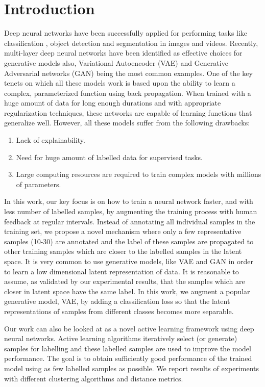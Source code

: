 \documentclass[runningheads]{llncs}
\begin{document}
\section{Introduction}
Deep neural networks have been successfully applied  for performing tasks like classification \cite{alexnet,vggnet,resnet}, object detection \cite{faster_rcnn,yolo} and segmentation \cite{deeplab,unet} in images and videos.
Recently, multi-layer deep neural networks have been identified as  effective  choices for  generative models also, Variational Autoencoder (VAE) \cite{vae} and Generative Adversarial networks (GAN) \cite{gan} being the most common examples.
One of the key tenets on which all these models work is  based upon the ability to learn a complex, parameterized function using back propagation.
When trained with a huge amount of data for long enough durations and with appropriate regularization techniques, these networks are capable of learning functions that generalize well.
However, all these  models suffer from the following drawbacks:
\begin{enumerate}
  \item Lack of explainability.
  \item Need for huge amount of labelled data for supervised tasks.
  \item Large computing resources are required to train complex models with millions of parameters.
\end{enumerate}

In this work, our key focus is on how to train a neural network faster, and with less number of labelled samples, by augmenting the training process with human feedback at regular intervals.
Instead of annotating all individual samples in the training set, we propose a novel mechanism where only a few representative samples (10-30) are annotated and the label of these samples are propagated to other training samples  which are closer to the labelled samples in the latent space.
It is very common to use  generative models, like VAE \cite{vae} and GAN\cite{gan} in order to learn a low dimensional latent representation of data.
It is reasonable to assume, as validated by our experimental results, that the samples which are closer in latent space have the same label.
In this work, we augment a popular generative model, VAE,  by adding a classification loss so that the latent representations of samples from different classes becomes more separable.

Our work can also be looked at  as a novel  active learning framework using deep neural networks.
Active learning algorithms iteratively select (or generate) samples for labelling and these labelled samples are used to improve the model performance.
The goal is to obtain sufficiently good performance of the trained model using as few labelled samples as possible.
We report results of experiments with different clustering algorithms and distance metrics.
\end{document}
